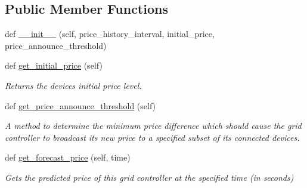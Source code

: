 \subsection*{Public Member Functions}
\begin{DoxyCompactItemize}
\item 
def \hyperlink{class_build_1_1_objects_1_1grid__controller_1_1_grid_controller_price_logic_ad41a0d1f0d453c278938a1615352a2a3}{\+\_\+\+\_\+init\+\_\+\+\_\+} (self, price\+\_\+history\+\_\+interval, initial\+\_\+price, price\+\_\+announce\+\_\+threshold)
\item 
\mbox{\label{class_build_1_1_objects_1_1grid__controller_1_1_grid_controller_price_logic_afa3d44f846108a1c8be4818b50347597}} 
def \hyperlink{class_build_1_1_objects_1_1grid__controller_1_1_grid_controller_price_logic_afa3d44f846108a1c8be4818b50347597}{get\+\_\+initial\+\_\+price} (self)
\begin{DoxyCompactList}\small\item\em Returns the devices initial price level. \end{DoxyCompactList}\item 
def \hyperlink{class_build_1_1_objects_1_1grid__controller_1_1_grid_controller_price_logic_a311d9e78fc37960b0404f60259ac92f3}{get\+\_\+price\+\_\+announce\+\_\+threshold} (self)
\begin{DoxyCompactList}\small\item\em A method to determine the minimum price difference which should cause the grid controller to broadcast its new price to a specified subset of its connected devices. \end{DoxyCompactList}\item 
\mbox{\label{class_build_1_1_objects_1_1grid__controller_1_1_grid_controller_price_logic_abfafee704233af88153846874f1c7d98}} 
def \hyperlink{class_build_1_1_objects_1_1grid__controller_1_1_grid_controller_price_logic_abfafee704233af88153846874f1c7d98}{get\+\_\+forecast\+\_\+price} (self, time)
\begin{DoxyCompactList}\small\item\em Gets the predicted price of this grid controller at the specified time (in seconds) \end{DoxyCompactList}\item 
\mbox{\label{class_build_1_1_objects_1_1grid__controller_1_1_grid_controller_price_logic_a58470569ce8fe9ce1907e3f8784426a5}} 

\end{DoxyCompactItemize}
